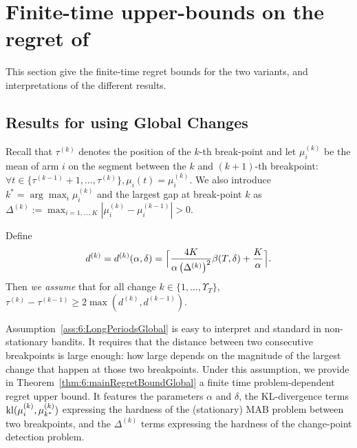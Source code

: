 \section{Finite-time upper-bounds on the regret of \GLRklUCB}
\label{sec:6:RegretAnalysis}

This section give the finite-time regret bounds for the two variants, and interpretations of the different results.

\subsection{Results for \GLRklUCB{} using Global Changes}

Recall that $\tau^{(k)}$ denotes the position of the $k$-th break-point and let $\mu_i^{(k)}$ be the mean of arm $i$ on the segment between the $k$ and $(k+1)$-th breakpoint:
$\forall t \in \{ \tau^{(k-1)}+1, \dots, \tau^{(k)} \}, \mu_{i}(t) = \mu_i^{(k)}$. We also introduce $k^* = \arg\max_i \mu_i^{(k)} $ and the largest gap at break-point $k$ as $\Delta^{(k)} := \max_{i=1,\dots,K} |\mu_i^{(k)} - \mu_i^{(k-1)}| >0$.


\begin{assumption}\label{ass:6:LongPeriodsGlobal}
\begin{leftbar}[assumptionbar]  %
    Define
    \begin{equation}\label{def:6:DelayGlobal}
        d^{(k)} = d^{(k)}(\alpha,\delta) = \Bigl\lceil \frac{4K}{\alpha\left(\Delta^{(k)}\right)^2}\beta(T,\delta) + \frac{K}{\alpha} \Bigr\rceil.
    \end{equation}
    Then \emph{we assume} that for all change $k \in \{1,\dots,\Upsilon_T\}$,
    $\tau^{(k)} - \tau^{(k-1)} \geq 2\max (d^{(k)},d^{(k-1)})$.
\end{leftbar}  %
\end{assumption}

Assumption~\ref{ass:6:LongPeriodsGlobal} is easy to interpret and standard in non-stationary bandits.
It requires that the distance between two consecutive breakpoints is large enough: how large depends on the magnitude of the largest change that happen at those two breakpoints.
Under this assumption, we provide in Theorem~\ref{thm:6:mainRegretBoundGlobal} a finite time problem-dependent regret upper bound.
It features the parameters $\alpha$ and $\delta$,
the KL-divergence terms $\mathrm{kl}(\mu_{i}^{(k)},\mu_{k^*}^{(k)})$ expressing the hardness of the (stationary) MAB problem between two breakpoints,
and the $\Delta^{(k)}$ terms expressing the hardness of the change-point detection problem.

